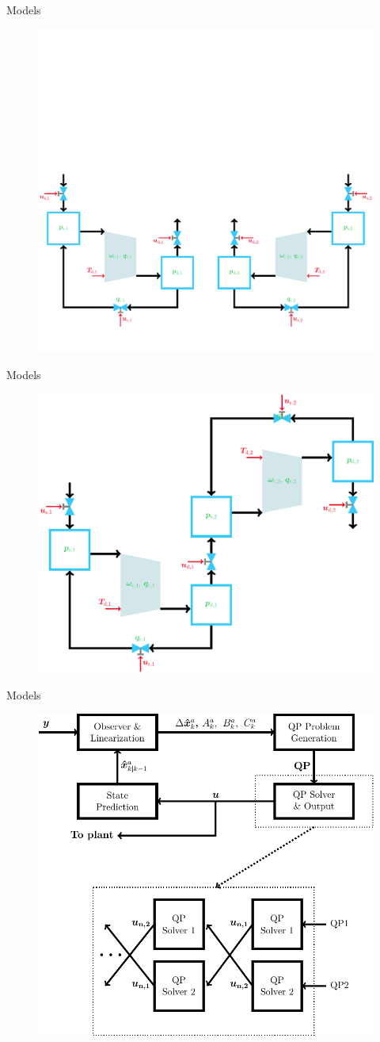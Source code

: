 \begin{frame}{Models}
  \begin{figure}[H]
    \centering
    \includegraphics[width=.8\linewidth]{figures/parallelcompressor.pdf}
  \end{figure}
\end{frame}

\begin{frame}{Models}
  \begin{figure}[H]
    \centering
    \includegraphics[width=.5\linewidth]{figures/serialcompressor.pdf}
  \end{figure}
\end{frame}

\begin{frame}{Models}
  \begin{figure}[H]
    \centering
    \includegraphics[width=.5\linewidth]{figures/algorithm.pdf}
  \end{figure}
\end{frame}
